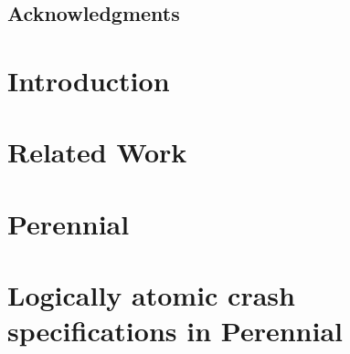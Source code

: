 \documentclass[11pt,twoside,final]{mitthesis}
\begin{document}



\maketitle

\begin{abstractpage}

\end{abstractpage}
\cleardoublepage

\section*{Acknowledgments}
\begin{spacing}{1}
  
\end{spacing}
\cleardoublepage


\tableofcontents
\clearpage
\listoffigures
\clearpage

\listoftodos


\chapter{Introduction}%
\label{ch:introduction}


\chapter{Related Work}%
\label{ch:related}


\chapter{Perennial}%
\label{ch:perennial}


\chapter{Logically atomic crash specifications in Perennial}%
\label{ch:crash-logatom}

\end{document}
